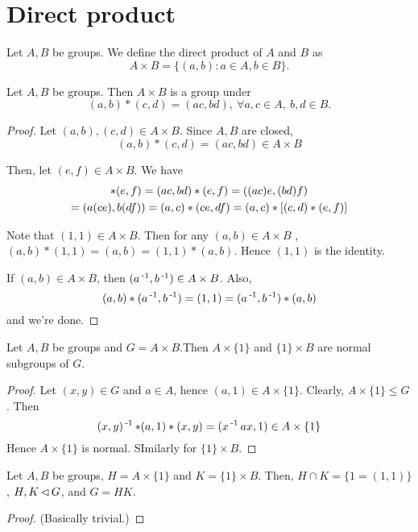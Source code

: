 \documentclass[12pt]{article}
\begin{document}
\newpage
\section{Direct product}
	\begin{define}
		Let $A,B$ be groups. We define the direct product of $A$ and $B$ as
		\begin{equation*}
			A\times B = \{(a,b) : a\in A, b\in B\}.
		\end{equation*}
	\end{define}

	\begin{theorem}
		Let $A,B$ be groups. Then $A\times B$ is a group under
		$$(a,b)*(c,d) = (ac,bd),\ \forall a,c\in A,\ b,d\in B.$$
	\end{theorem}
	\begin{proof}
		Let $(a,b),(c,d)\in A\times B$. Since $A,B$ are closed, 
		$$(a,b)*(c,d) = (ac,bd) \in A\times B$$

		Then, let $(e,f) \in A\times B$. We have
		\begin{multline*}
		[(a,b)*(c,d)]*(e,f) = (ac,bd)*(e,f) = ((ac)e, (bd)f)\\ 
		= (a(ce),b(df)) = (a,c) * (ce,df) = (a,c) * [(c,d) * (e,f)]$$
		\end{multline*}
		
		Note that $(1,1)\in A\times B$. Then for any $(a,b) \in A\times B$
		, $(a,b)*(1,1) = (a,b) = (1,1) * (a,b)$. Hence $(1,1)$ is the identity.

		If $(a,b)\in A\times B$, then $(a\operatorname{^{-1}},b\operatorname{^{-1}}) \in A\times B$. Also,
		$$(a,b)*(a\operatorname{^{-1}},b\operatorname{^{-1}}) = (1,1) = (a\operatorname{^{-1}},b\operatorname{^{-1}}) * (a,b)$$
		and we're done.
	\end{proof}

	\begin{theorem}
		Let $A,B$ be groups and $G=A\times B$.Then $A\times \{1\}$ and $\{1\}\times B$ are normal subgroups of $G$.
	\end{theorem}
	\begin{proof}
		Let $(x,y) \in G$ and $a\in A$, hence $(a,1) \in A\times\{1\}$. Clearly, $A\times\{1\} \leq G$. Then
		$$(x,y)\operatorname{^{-1}} * (a,1) * (x,y) = (x\operatorname{^{-1}} ax,1) \in A\times\{1\}$$
		Hence $A\times\{1\}$ is normal. SImilarly for $\{1\}\times B$.
	\end{proof}

	\begin{theorem}
		Let $A,B$ be groups, $H=A\times \{1\}$ and $K=\{1\}\times B$. Then, $H\cap K = \{1=(1,1)\}$, $H,K\operatorname{\vartriangleleft} G$, and $G = HK$.
	\end{theorem}
	\begin{proof}
		(Basically trivial.)
	\end{proof}
\end{document}
